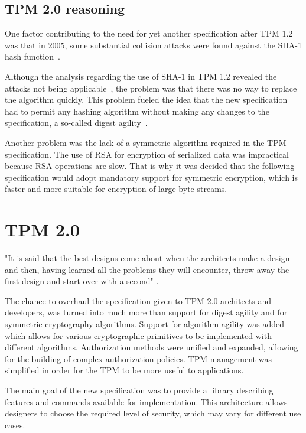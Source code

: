 
\subsection{TPM 2.0 reasoning}
One factor contributing to the need for yet another specification after TPM 1.2 was that in 2005, some substantial collision attacks were found against the SHA-1 hash function~\cite{wang2005findingShaBroken}. 

Although the analysis regarding the use of SHA-1 in TPM 1.2 revealed the attacks not being applicable~\cite{tcg_tpm1.2_sha-1_uses}, the problem was that there was no way to replace the algorithm quickly. This problem fueled the idea that the new specification had to permit any hashing algorithm without making any changes to the specification, a so-called digest agility~\cite[p.~4]{arthur2015practical}. 

Another problem was the lack of a symmetric algorithm required in the TPM specification. The use of RSA for encryption of serialized data was impractical because RSA operations are slow. That is why it was decided that the following specification would adopt mandatory support for symmetric encryption, which is faster and more suitable for encryption of large byte streams. 


\section{TPM 2.0}\label{sec:tpm2}
"It is said that the best designs come about when the architects make a design and
then, having learned all the problems they will encounter, throw away the first design and
start over with a second" \cite[p.~4]{arthur2015practical}.

The chance to overhaul the specification given to TPM 2.0 architects and developers, was turned into much more than support for digest agility and for symmetric cryptography algorithms. Support for algorithm agility was added which allows for various cryptographic primitives to be implemented with different algorithms. Authorization methods were unified and expanded, allowing for the building of complex authorization policies. TPM management was simplified in order for the TPM to be more useful to applications.

The main goal of the new specification was to provide a library describing features and commands available for implementation. This architecture allows designers to choose the required level of security, which may vary for different use cases. 

